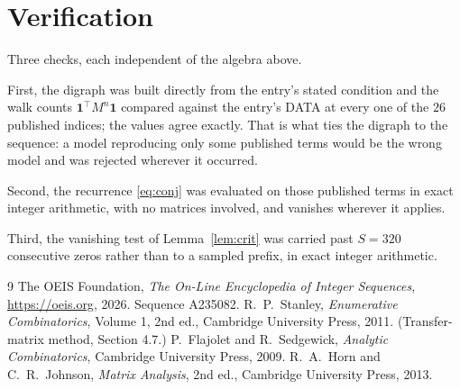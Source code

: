 \documentclass[11pt,a4paper]{article}
\theoremstyle{plain}
\theoremstyle{definition}
\begin{document}
\section{Verification}

Three checks, each independent of the algebra above.

First, the digraph was built directly from the entry's stated condition and the walk counts
$\mathbf{1}^{\!\top}M^{n}\mathbf{1}$ compared against the entry's DATA at every one of
the $26$ published indices; the values agree exactly. That is what ties the digraph to
the sequence: a model reproducing only some published terms would be the wrong model and
was rejected wherever it occurred.

Second, the recurrence \eqref{eq:conj} was evaluated on those published terms in exact
integer arithmetic, with no matrices involved, and vanishes wherever it applies.

Third, the vanishing test of Lemma~\ref{lem:crit} was carried past $S=320$ consecutive
zeros rather than to a sampled prefix, in exact integer arithmetic.

\begin{thebibliography}{9}
 The OEIS Foundation, \emph{The On-Line Encyclopedia of Integer
Sequences}, \url{https://oeis.org}, 2026. Sequence A235082.
 R.~P.~Stanley, \emph{Enumerative Combinatorics}, Volume 1, 2nd ed.,
Cambridge University Press, 2011. (Transfer-matrix method, Section 4.7.)
 P.~Flajolet and R.~Sedgewick, \emph{Analytic Combinatorics}, Cambridge
University Press, 2009.
 R.~A.~Horn and C.~R.~Johnson, \emph{Matrix Analysis}, 2nd ed., Cambridge
University Press, 2013.
\end{thebibliography}
\end{document}
